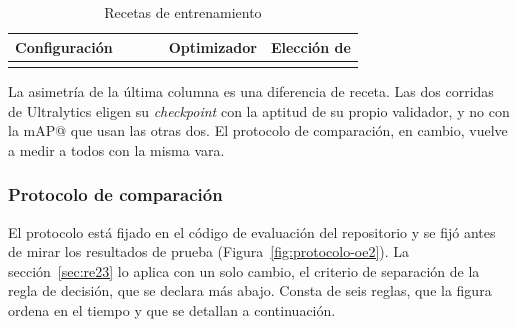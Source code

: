 \begin{table}[htbp]
    \centering
    \small
    \begin{threeparttable}
        \caption{Recetas de entrenamiento}
        \label{tab:recetas}
        \begin{tabular}{@{}L{3.6cm}rrlL{2.6cm}L{3.0cm}@{}}
            \toprule
            \textbf{Configuración} &  &  &  & \textbf{Optimizador} & \textbf{Elección de } \\
            \midrule
             \\
            \bottomrule
        \end{tabular}
    \end{threeparttable}
\end{table}

La asimetría de la última columna es una diferencia de receta. Las dos corridas
de Ultralytics eligen su \textit{checkpoint} con la aptitud de su propio validador,
y no con la mAP@\pMatchIou{} que usan las otras dos. El protocolo de comparación,
en cambio, vuelve a medir a todos con la misma vara.

\subsubsection{Protocolo de comparación}
\label{sec:protocolo-oe2}

El protocolo está fijado en el código de evaluación del repositorio y se fijó
antes de mirar los resultados de prueba (Figura~\ref{fig:protocolo-oe2}). La
sección~\ref{sec:re23} lo aplica con un solo cambio, el criterio de separación de
la regla de decisión, que se declara más abajo. Consta de seis reglas, que la
figura ordena en el tiempo y que se detallan a continuación.

